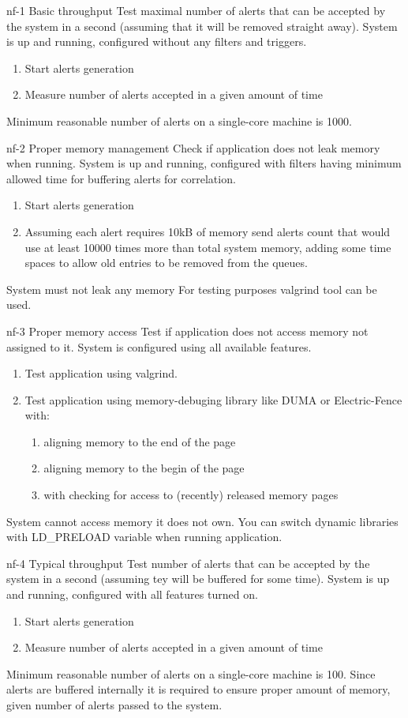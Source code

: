 \testCase
{nf-1}
{Basic throughput}
{Test maximal number of alerts that can be accepted by the system in a second (assuming that it will be removed straight away).}
{System is up and running, configured without any filters and triggers.}
{
\begin{enumerate}
\item{Start alerts generation}
\item{Measure number of alerts accepted in a given amount of time}
\end{enumerate}
}
{Minimum reasonable number of alerts on a single-core machine is 1000.}
{}


\testCase
{nf-2}
{Proper memory management}
{Check if application does not leak memory when running.}
{System is up and running, configured with filters having minimum allowed time for buffering alerts for correlation.}
{
\begin{enumerate}
\item{Start alerts generation}
\item{Assuming each alert requires 10kB of memory send alerts count that would use at least 10000 times more than total system memory, adding some time spaces to allow old entries to be removed from the queues.}
\end{enumerate}
}
{System must not leak any memory}
{For testing purposes valgrind tool can be used.}


\testCase
{nf-3}
{Proper memory access}
{Test if application does not access memory not assigned to it.}
{System is configured using all available features.}
{
\begin{enumerate}
\item{Test application using valgrind.}
\item{Test application using memory-debuging library like DUMA or Electric-Fence with:}
  \begin{enumerate}
  \item aligning memory to the end of the page
  \item aligning memory to the begin of the page
  \item with checking for access to (recently) released memory pages
  \end{enumerate}
\end{enumerate}
}
{System cannot access memory it does not own.}
{You can switch dynamic libraries with LD\_PRELOAD variable when running application.}


\testCase
{nf-4}
{Typical throughput}
{Test number of alerts that can be accepted by the system in a second (assuming tey will be buffered for some time).}
{System is up and running, configured with all features turned on.}
{
\begin{enumerate}
\item{Start alerts generation}
\item{Measure number of alerts accepted in a given amount of time}
\end{enumerate}
}
{Minimum reasonable number of alerts on a single-core machine is 100.}
{Since alerts are buffered internally it is required to ensure proper amount of memory, given number of alerts passed to the system.}

